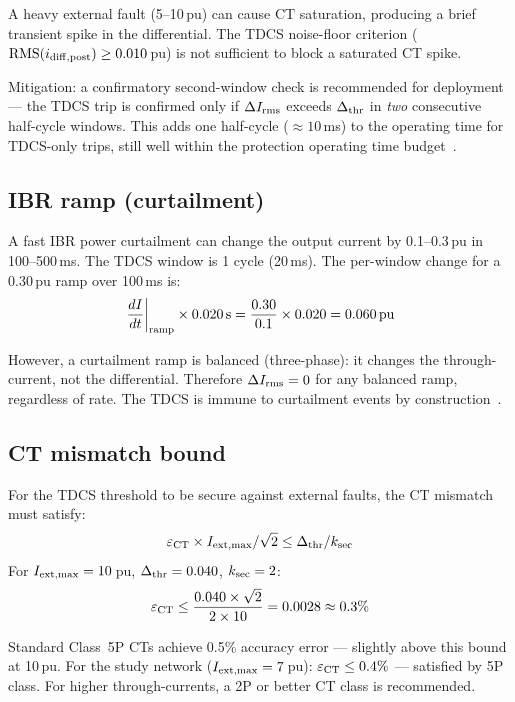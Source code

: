 \documentclass[11pt, a4paper]{article}
\begin{document}
A heavy external fault (5--10\,pu) can cause CT saturation, producing a
brief transient spike in the differential.  The TDCS noise-floor criterion
($\text{RMS}(i_{\rm diff,post}) \geq 0.010$\,pu) is not sufficient to
block a saturated CT spike.

Mitigation: a confirmatory second-window check is recommended for
deployment — the TDCS trip is confirmed only if $\Delta I_{\rm rms}$ exceeds
$\Delta_{\rm thr}$ in \emph{two} consecutive half-cycle windows.  This
adds one half-cycle ($\approx 10$\,ms) to the operating time for TDCS-only
trips, still well within the protection operating time
budget~\cite{IEEE_C37_243}.

\subsection{IBR ramp (curtailment)}

A fast IBR power curtailment can change the output current by 0.1--0.3\,pu
in 100--500\,ms.  The TDCS window is 1 cycle (20\,ms).  The
per-window change for a 0.30\,pu ramp over 100\,ms is:
\begin{equation}
  \left.\frac{dI}{dt}\right|_{\rm ramp} \times 0.020\,\text{s}
  = \frac{0.30}{0.1} \times 0.020 = 0.060\,\text{pu}
\end{equation}

However, a curtailment ramp is balanced (three-phase): it changes the
through-current, not the differential.  Therefore $\Delta I_{\rm rms} = 0$
for any balanced ramp, regardless of rate.  The TDCS is immune to
curtailment events by construction~\cite{Hooshyar2019}.

\subsection{CT mismatch bound}

For the TDCS threshold to be secure against external faults, the CT
mismatch must satisfy:
\begin{equation}
  \varepsilon_{\rm CT} \times I_{\rm ext,max} / \sqrt{2}
  \leq \Delta_{\rm thr} / k_{\rm sec}
\end{equation}
For $I_{\rm ext,max} = 10$\,pu, $\Delta_{\rm thr} = 0.040$, $k_{\rm sec} = 2$:
\begin{equation}
  \varepsilon_{\rm CT} \leq \frac{0.040 \times \sqrt{2}}{2 \times 10}
                       = 0.0028 \approx 0.3\%
\end{equation}

Standard Class~5P CTs achieve 0.5\% accuracy error — slightly above this
bound at 10\,pu.  For the study network ($I_{\rm ext,max} = 7$\,pu):
$\varepsilon_{\rm CT} \leq 0.4\%$ — satisfied by 5P class.  For higher
through-currents, a 2P or better CT class is recommended.
\end{document}
